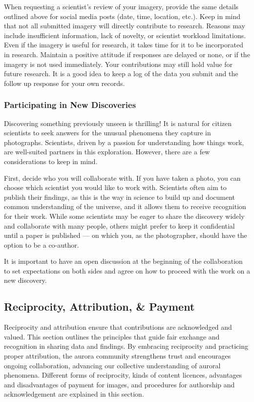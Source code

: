 \documentclass{article}
\newcommand{\contributed}[1]{%
    \par\noindent
    \begingroup
    \setlength{\leftskip}{1em}%
    \itshape
    Contributors: #1
    \par
    \endgroup
    \vspace{0.5em}
}
\begin{document}
When requesting a scientist's review of your imagery, provide the same details outlined above for social media posts (date, time, location, etc.). Keep in mind that not all submitted imagery will directly contribute to research. Reasons may include insufficient information, lack of novelty, or scientist workload limitations. Even if the imagery is useful for research, it takes time for it to be incorporated in research. Maintain a positive attitude if responses are delayed or none, or if the imagery is not used immediately. Your contributions may still hold value for future research. It is a good idea to keep a log of the data you submit and the follow up response for your own records.


\subsubsection{Participating in New Discoveries}
Discovering something previously unseen is thrilling! It is natural for citizen scientists to seek answers for the unusual phenomena they capture in photographs. Scientists, driven by a passion for understanding how things work, are well-suited partners in this exploration. However, there are a few considerations to keep in mind.

First, decide who you will collaborate with. If you have taken a photo, you can choose which scientist you would like to work with. Scientists often aim to publish their findings, as this is the way in science to build up and document common understanding of the universe, and it allows them to receive recognition for their work. While some scientists may be eager to share the discovery widely and collaborate with many people, others might prefer to keep it confidential until a paper is published — on which you, as the photographer, should have the option to be a co-author. 

It is important to have an open discussion at the beginning of the collaboration to set expectations on both sides and agree on how to proceed with the work on a new discovery.

\subsection{Reciprocity, Attribution, \& Payment} 

Reciprocity and attribution ensure that contributions are acknowledged and valued. This section outlines the principles that guide fair exchange and recognition in sharing data and findings. By embracing reciprocity and practicing proper attribution, the aurora community strengthens trust and encourages ongoing collaboration, advancing our collective understanding of auroral phenomena. Different forms of reciprocity, kinds of content licences, advantages and disadvantages of payment for images, and procedures for authorship and acknowledgement are explained in this section.
\end{document}
